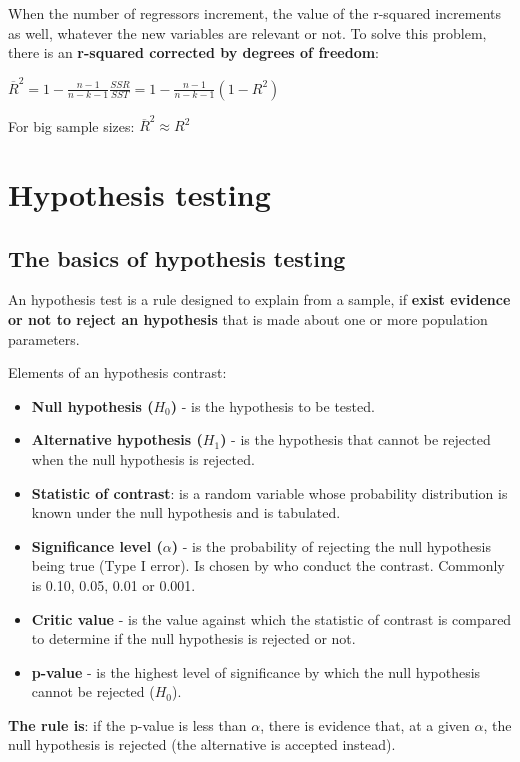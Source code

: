 \documentclass[10pt, a4paper, landscape]{extarticle}
\begin{document}
\begin{multicols}{3}
When the number of regressors increment, the value of the r-squared increments as well, whatever the new variables are relevant or not. To solve this problem, there is an \textbf{r-squared corrected by degrees of freedom}:

\begin{center}
$\overline{R}^2 = 1 - \frac{n-1}{n-k-1} \frac{SSR}{SST} = 1 - \frac{n-1}{n-k-1} (1-R^2)$
\end{center}

For big sample sizes: $\overline{R}^2 \approx R^2$

\section*{Hypothesis testing}
\subsection*{The basics of hypothesis testing}

An hypothesis test is a rule designed to explain from a sample, if \textbf{exist evidence or not to reject an hypothesis} that is made about one or more population parameters.

Elements of an hypothesis contrast:

\begin{itemize}[leftmargin=*]
\item \textbf{Null hypothesis ($H_0$)} - is the hypothesis to be tested.
\item \textbf{Alternative hypothesis ($H_1$)} - is the hypothesis that cannot be rejected when the null hypothesis is rejected.
\item \textbf{Statistic of contrast}: is a random variable whose probability distribution is known under the null hypothesis and is tabulated.
\item \textbf{Significance level ($\alpha$)} - is the probability of rejecting the null hypothesis being true (Type I error). Is chosen by who conduct the contrast. Commonly is 0.10, 0.05, 0.01 or 0.001.
\item \textbf{Critic value} - is the value against which
the statistic of contrast is compared to determine if the
null hypothesis is rejected or not.
\item \textbf{p-value} - is the highest level of significance by which the null hypothesis cannot be rejected ($H_0$).
\end{itemize}

\textbf{The rule is}: if the p-value is less than $\alpha$, there is evidence that, at a given $\alpha$, the null hypothesis is rejected (the alternative is accepted instead).


\end{multicols}
\end{document}
